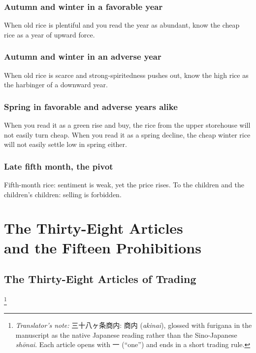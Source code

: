 \documentclass[10pt, openany]{book}
\newcommand{\jp}[1]{{\japanesefont #1}}
\newcommand{\tn}[1]{\footnote{\textit{Translator's note:} #1}}
\newcommand{\jt}[2]{\jp{#1} (\textit{#2})}
\begin{document}
\subsection*{Autumn and winter in a favorable year}

When old rice is plentiful and you read the year as abundant, know
the cheap rice as a year of upward force.

\subsection*{Autumn and winter in an adverse year}

When old rice is scarce and strong-spiritedness pushes out, know
the high rice as the harbinger of a downward year.

\subsection*{Spring in favorable and adverse years alike}

When you read it as a green rise and buy, the rice from the upper
storehouse will not easily turn cheap. When you read it as a
spring decline, the cheap winter rice will not easily settle low
in spring either.

\subsection*{Late fifth month, the pivot}

Fifth-month rice: sentiment is weak, yet the price rises. To the
children and the children's children: selling is forbidden.

\chapter{The Thirty-Eight Articles\\ and the Fifteen Prohibitions}

\section{The Thirty-Eight Articles of Trading}\tn{%
\jp{三十八ヶ条商内}:
\jt{商内}{akinai}, glossed with furigana in the manuscript
as the native Japanese reading rather than the Sino-Japanese
\textit{sh\=onai}. Each article opens with \jp{一} (``one'') and
ends in a short trading rule.}
\end{document}
